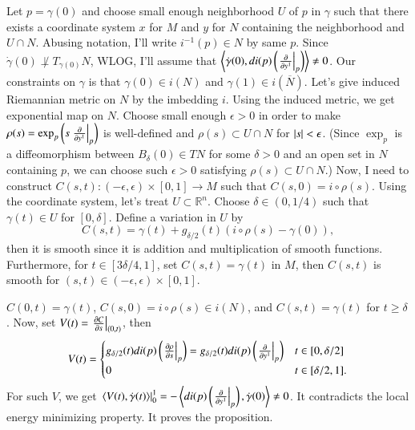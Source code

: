 \documentclass[a4paper, 12pt]{article}
\theoremstyle{Mydefinition}
\theoremstyle{Mytheorem}
\begin{document}
Let $p=\gamma(0)$ and choose small enough neighborhood $U$ of $p$ in $\gamma$ such that there exists a coordinate system $x$ for $M$ and $y$ for $N$ containing the neighborhood and $U\cap N$. Abusing notation, I'll write $i^{-1}(p)\in N$ by same $p$. Since $\dot{\gamma}(0)\not\perp T_{\gamma(0)}N$, WLOG, I'll assume that $\left\langle \dot{\gamma}(0), di(p)\left(\left.\pdv{y^1}\right|_p\right)\right\rangle\neq 0$. Our constraints on $\gamma$ is that $\gamma(0)\in i(N)$ and $\gamma(1)\in i(\overline{N})$. Let's give induced Riemannian metric on $N$ by the imbedding $i$. Using the induced metric, we get exponential map on $N$. Choose small enough $\epsilon>0$ in order to make $\rho(s) = \exp_p\left(s\left.\pdv{y^1}\right|_{p}\right)$ is well-defined and $\rho(s)\subset U\cap N$ for $\abs{s}<\epsilon$. (Since $\exp_p$ is a diffeomorphism between $B_\delta(0)\in TN$ for some $\delta>0$ and an open set in $N$ containing $p$, we can choose such $\epsilon>0$ satisfying $\rho(s)\subset U\cap N$.) Now, I need to construct $C(s,t):(-\epsilon, \epsilon)\times[0,1]\rightarrow M$ such that $C(s, 0) = i\circ \rho(s)$. Using the coordinate system, let's treat $U\subset \mathbb{R}^n$. Choose $\delta\in(0,1/4)$ such that $\gamma(t)\in U$ for $[0,\delta]$. Define a variation in $U$ by
\begin{equation}
    C(s,t) = \gamma(t) + g_{\delta/2}(t)(i\circ\rho(s)-\gamma(0)),
\end{equation}
then it is smooth since it is addition and multiplication of smooth functions. Furthermore, for $t\in [3\delta/4, 1]$, set $C(s,t) = \gamma(t)$ in $M$, then $C(s,t)$ is smooth for $(s,t)\in(-\epsilon, \epsilon)\times[0,1]$.

$C(0,t) = \gamma(t)$, $C(s, 0) = i\circ\rho(s)\in i(N)$, and $C(s,t) = \gamma(t)$ for $t\geq\delta$. Now, set $V(t) = \left.\pdv{C}{s}\right|_{(0,t)}$, then
\begin{equation}
    V(t) = \begin{cases}
    g_{\delta/2}(t)di(p)\left(\left.\pdv{\rho}{s}\right|_{p}\right) = g_{\delta/2}(t)di(p)\left(\left.\pdv{y^1}\right|_{p}\right) & t\in[0,\delta/2]\\
    0 & t\in [\delta/2, 1].
    \end{cases}
\end{equation}
For such $V$, we get $\left.\left\langle V(t), \dot{\gamma}(t)\right\rangle\right|_0^1 = -\left\langle di(p)\left(\left.\pdv{y^1}\right|_p\right), \dot{\gamma}(0)\right\rangle\neq 0$. It contradicts the local energy minimizing property. It proves the proposition.
\end{document}
